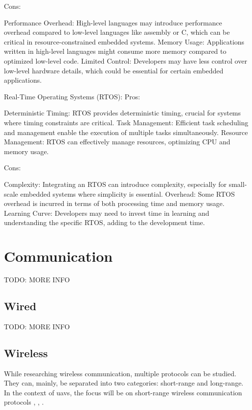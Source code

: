 Cons:

Performance Overhead: High-level languages may introduce performance overhead compared to low-level languages like assembly or C, which can be critical in resource-constrained embedded systems.
Memory Usage: Applications written in high-level languages might consume more memory compared to optimized low-level code.
Limited Control: Developers may have less control over low-level hardware details, which could be essential for certain embedded applications.

Real-Time Operating Systems (RTOS):
Pros:

Deterministic Timing: RTOS provides deterministic timing, crucial for systems where timing constraints are critical.
Task Management: Efficient task scheduling and management enable the execution of multiple tasks simultaneously.
Resource Management: RTOS can effectively manage resources, optimizing CPU and memory usage.

Cons:

Complexity: Integrating an RTOS can introduce complexity, especially for small-scale embedded systems where simplicity is essential.
Overhead: Some RTOS overhead is incurred in terms of both processing time and memory usage.
Learning Curve: Developers may need to invest time in learning and understanding the specific RTOS, adding to the development time.






\section{Communication}
TODO: MORE INFO\\
\subsection{Wired}
TODO: MORE INFO\\

\subsection{Wireless}
While researching wireless communication, multiple protocols can be studied. They can, mainly, be separated into two categories: short-range and long-range.
In the context of \glspl{uav}, the focus will be on short-range wireless communication protocols \cite{WCOM1}, \cite{WCOM6}, \cite{WCOM7}.

